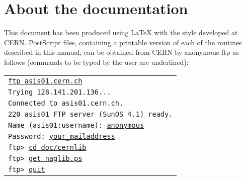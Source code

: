 \section*{About the documentation}
 
This document has been produced using \LaTeX{}
with the  style developed at CERN.
PostScript files, containing a printable version of each of the routines
described in this manual, can be obtained from CERN
by anonymous ftp as follows
(commands to be typed by the user are underlined):
 
\vspace*{3mm}
\begin{tabular}{@{\hspace{12mm}}>{\tt}l}
\underline{ftp asis01.cern.ch}\\
Trying 128.141.201.136...\\
Connected to asis01.cern.ch.\\
220 asis01 FTP server (SunOS 4.1) ready.\\
Name (asis01:username): \underline{anonymous}\\
Password: \underline{your\_{}mailaddress}\\
ftp> \underline{cd doc/cernlib}\\
ftp> \underline{get naglib.ps}\\
ftp> \underline{quit}\\
\end{tabular}
 
\newpage
 
\tableofcontents
